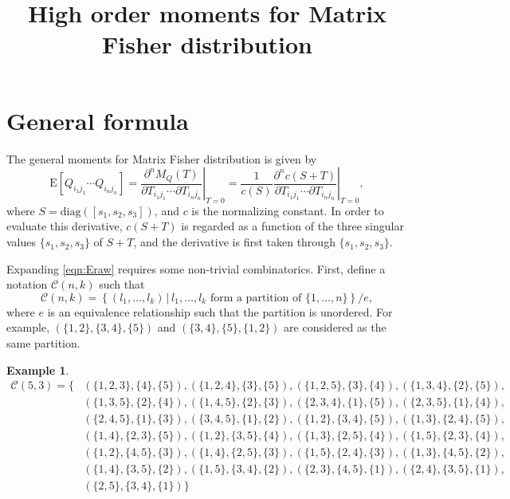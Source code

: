 \documentclass[10pt]{article}
\title{\vspace{-4ex}\textbf{High order moments for Matrix Fisher distribution\vspace{-4ex}}}
\date{}
\newtheorem{example}{Example}
\newcommand{\expect}[1]{\ensuremath{\mathrm{E}\left[ #1 \right]}}
\begin{document}
\maketitle

\section{General formula}

The general moments for Matrix Fisher distribution is given by
\begin{equation} \label{eqn:Eraw}
	\expect{Q_{i_1j_1} \cdots Q_{i_nj_n}} = \left. \frac{\partial^n M_Q(T)}{\partial T_{i_1j_1} \cdots \partial T_{i_nj_n}} \right|_{T=0} = \frac{1}{c(S)} \left. \frac{\partial^n c(S+T)}{\partial T_{i_1j_1} \cdots \partial T_{i_nj_n}} \right|_{T=0},
\end{equation}
where $S = \mathrm{diag}([s_1,s_2,s_3])$, and $c$ is the normalizing constant.
In order to evaluate this derivative, $c(S+T)$ is regarded as a function of the three singular values $\{s_1,s_2,s_3\}$ of $S+T$, and the derivative is first taken through $\{s_1,s_2,s_3\}$.

Expanding \eqref{eqn:Eraw} requires some non-trivial combinatorics. First, define a notation $\mathcal{C}(n,k)$ such that
\begin{equation}
	\mathcal{C}(n,k) = \left\{ (l_1,\ldots,l_k) \,|\, l_1,\ldots,l_k \text{ form a partition of } \{1,\ldots,n\} \right\}/e,
\end{equation}
where $e$ is an equivalence relationship such that the partition is unordered.
For example, $(\{1,2\},\{3,4\},\{5\})$ and $(\{3,4\},\{5\},\{1,2\})$ are considered as the same partition.

\begin{example}
	\begin{align*}
		\mathcal{C}(5,3) = \big\{&(\{1,2,3\},\{4\},\{5\}), (\{1,2,4\},\{3\},\{5\}), (\{1,2,5\},\{3\},\{4\}), (\{1,3,4\},\{2\},\{5\}), \\
		&(\{1,3,5\},\{2\},\{4\}), (\{1,4,5\},\{2\},\{3\}), (\{2,3,4\},\{1\},\{5\}), (\{2,3,5\},\{1\},\{4\}), \\
		&(\{2,4,5\},\{1\},\{3\}), (\{3,4,5\},\{1\},\{2\}), (\{1,2\},\{3,4\},\{5\}), (\{1,3\},\{2,4\},\{5\}), \\
		&(\{1,4\},\{2,3\},\{5\}), (\{1,2\},\{3,5\},\{4\}), (\{1,3\},\{2,5\},\{4\}), (\{1,5\},\{2,3\},\{4\}), \\
		&(\{1,2\},\{4,5\},\{3\}), (\{1,4\},\{2,5\},\{3\}), (\{1,5\},\{2,4\},\{3\}), (\{1,3\},\{4,5\},\{2\}), \\
		&(\{1,4\},\{3,5\},\{2\}), (\{1,5\},\{3,4\},\{2\}), (\{2,3\},\{4,5\},\{1\}), (\{2,4\},\{3,5\},\{1\}), \\
		&(\{2,5\},\{3,4\},\{1\}) \big\}
	\end{align*}
\end{example}
\end{document}
